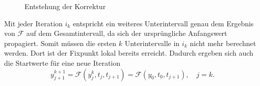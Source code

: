 \begin{figure}[ht]
    \centering
        \begin{tikzpicture}[scale=2.2]
            
        \end{tikzpicture}
    \caption{Entstehung der Korrektur}
    \label{fig:merge}
\end{figure}
Mit jeder Iteration \(i_k\) entspricht ein weiteres Unterintervall genau dem Ergebnis von \(\mathcal{F}\) auf dem Gesamtintervall, da sich der ursprüngliche Anfangswert propagiert. Somit müssen die ersten \(k\) Unterintervalle in \(i_k\) nicht mehr berechnet werden. Dort ist der Fixpunkt lokal bereits erreicht. Dadurch ergeben sich auch die Startwerte für eine neue Iteration
\begin{displaymath}
    y_{j+1}^{k+1} = \mathcal{F}\!\!\left(y_{j}^{k}, t_j, t_{j+1}\right) = \mathcal{F}\!\!\left(y_0, t_0, t_{j+1}\right), \quad j = k.
\end{displaymath}

